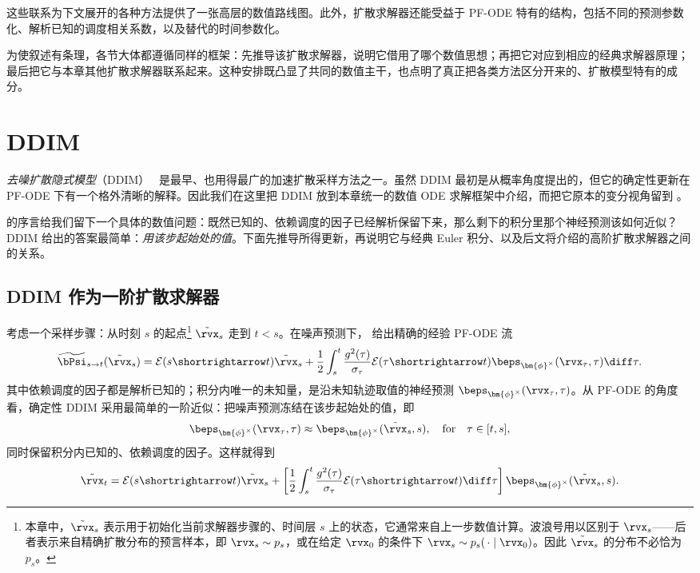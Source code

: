 这些联系为下文展开的各种方法提供了一张高层的数值路线图。此外，扩散求解器还能受益于 PF-ODE 特有的结构，包括不同的预测参数化、解析已知的调度相关系数，以及替代的时间参数化。

为使叙述有条理，各节大体都遵循同样的框架：先推导该扩散求解器，说明它借用了哪个数值思想；再把它对应到相应的经典求解器原理；最后把它与本章其他扩散求解器联系起来。这种安排既凸显了共同的数值主干，也点明了真正把各类方法区分开来的、扩散模型特有的成分。


\section{\texorpdfstring{DDIM}{DDIM}}\label{sec:revisit-ddim}

\emph{去噪扩散隐式模型}（DDIM）~\citep{song2020denoising} 是最早、也用得最广的加速扩散采样方法之一。虽然 DDIM 最初是从概率角度提出的，但它的确定性更新在 PF-ODE 下有一个格外清晰的解释。因此我们在这里把 DDIM 放到本章统一的数值 ODE 求解框架中介绍，而把它原本的变分视角留到 。

 的序言给我们留下一个具体的数值问题：既然已知的、依赖调度的因子已经解析保留下来，那么剩下的积分里那个神经预测该如何近似？DDIM 给出的答案最简单：\emph{用该步起始处的值}。下面先推导所得更新，再说明它与经典 Euler 积分、以及后文将介绍的高阶扩散求解器之间的关系。


\subsection{DDIM 作为一阶扩散求解器}\label{subsec:ddim-different-para}

考虑一个采样步骤：从时刻 $s$ 的起点\footnote{本章中，$\tilde{\rvx}_s$ 表示用于初始化当前求解器步骤的、时间层 $s$ 上的状态，它通常来自上一步数值计算。波浪号用以区别于 $\rvx_s$——后者表示来自精确扩散分布的预言样本，即 $\rvx_s \sim p_s$，或在给定 $\rvx_0$ 的条件下 $\rvx_s \sim p_s(\,\cdot \mid \rvx_0)$。因此 $\tilde{\rvx}_s$ 的分布不必恰为 $p_s$。} $\tilde\rvx_s$ 走到 $t<s$。在噪声预测下，
 给出精确的经验 PF-ODE 流
\begin{align*}
\widetilde\bPsi_{s\to t}(\tilde\rvx_s)
=
\mathcal E(s\shortrightarrow t)\tilde\rvx_s
+
\frac{1}{2}
\int_s^t
\frac{g^2(\tau)}{\sigma_\tau}
\mathcal E(\tau\shortrightarrow t)
\beps_{\bm{\phi}^\times}(\rvx_\tau,\tau)
\diff\tau .
\end{align*}
其中依赖调度的因子都是解析已知的；积分内唯一的未知量，是沿未知轨迹取值的神经预测 $\beps_{\bm{\phi}^\times}(\rvx_\tau,\tau)$。从 PF-ODE 的角度看，确定性 DDIM 采用最简单的一阶近似：把噪声预测冻结在该步起始处的值，即
\[
\beps_{\bm{\phi}^\times}(\rvx_\tau,\tau)
\approx
\beps_{\bm{\phi}^\times}(\tilde\rvx_s,s),\quad\text{for}\quad \tau\in[t,s],
\]
同时保留积分内已知的、依赖调度的因子。这样就得到
\begin{align*}
\tilde\rvx_t
=
\mathcal E(s\shortrightarrow t)\tilde\rvx_s
+
\left[
\frac{1}{2}
\int_s^t
\frac{g^2(\tau)}{\sigma_\tau}
\mathcal E(\tau\shortrightarrow t)
\diff\tau
\right]
\beps_{\bm{\phi}^\times}(\tilde\rvx_s,s).
\end{align*}

